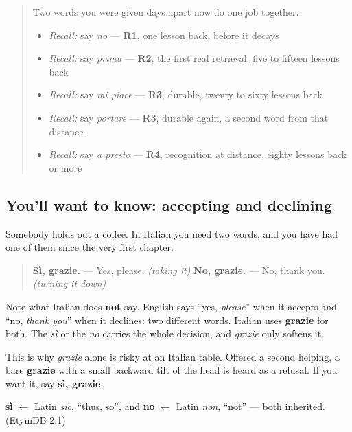 \begin{quote}
Two words you were given days apart now do one job together.

\begin{itemize}
\raggedright
  \item \emph{Recall:} say \emph{no} — \textbf{R1}, one lesson back, before it decays
  \item \emph{Recall:} say \emph{prima} — \textbf{R2}, the first real retrieval, five to fifteen lessons back
  \item \emph{Recall:} say \emph{mi piace} — \textbf{R3}, durable, twenty to sixty lessons back
  \item \emph{Recall:} say \emph{portare} — \textbf{R3}, durable again, a second word from that distance
  \item \emph{Recall:} say \emph{a presto} — \textbf{R4}, recognition at distance, eighty lessons back or more
\end{itemize}
\end{quote}

\subsection*{You'll want to know: accepting and declining}
Somebody holds out a coffee. In Italian you need two words, and you have had one of them since the very first chapter.

\begin{quote}
\textbf{Sì, grazie.} — Yes, please. \emph{(taking it)} \textbf{No, grazie.} — No, thank you. \emph{(turning it down)}
\end{quote}

Note what Italian does \textbf{not} say. English says \textquotedblleft{}yes, \emph{please}\textquotedblright{} when it accepts and \textquotedblleft{}no, \emph{thank you}\textquotedblright{} when it declines: two different words. Italian uses \textbf{grazie} for both. The \emph{sì} or the \emph{no} carries the whole decision, and \emph{grazie} only softens it.

This is why \emph{grazie} alone is risky at an Italian table. Offered a second helping, a bare \textbf{grazie} with a small backward tilt of the head is heard as a refusal. If you want it, say \textbf{sì, grazie}.

\begin{cousinweb}
\textbf{sì} $\leftarrow$ Latin \emph{sic}, \textquotedblleft{}thus, so\textquotedblright{}, and \textbf{no} $\leftarrow$ Latin \emph{non}, \textquotedblleft{}not\textquotedblright{} — both inherited. (EtymDB 2.1)
\end{cousinweb}

